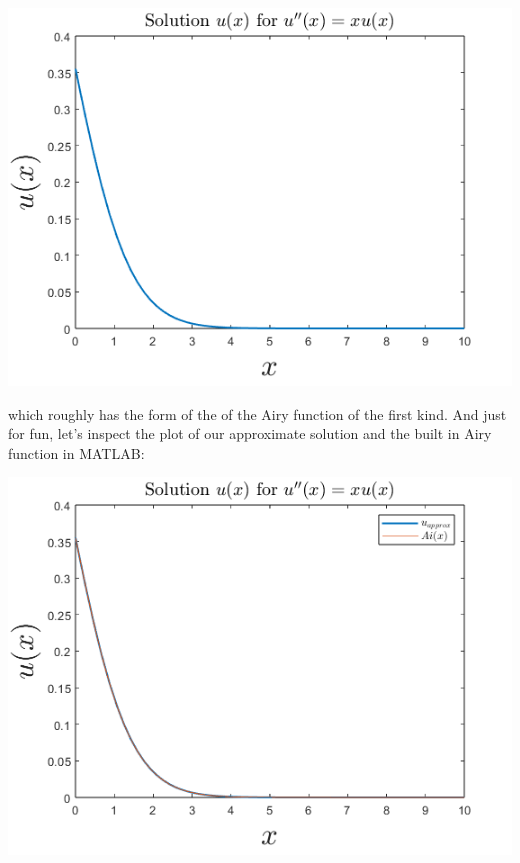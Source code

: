 \documentclass{article}
\begin{document}
\begin{center}
    \includegraphics[scale = 0.6]{prob4plot2.png}
\end{center}
which roughly has the form of the of the Airy function of the first kind. And just for fun, let's inspect the plot of our approximate solution and the built in Airy function in MATLAB:
\begin{center}
    \includegraphics[scale = 0.5]{approxvsai.png}
\end{center}
\end{document}
